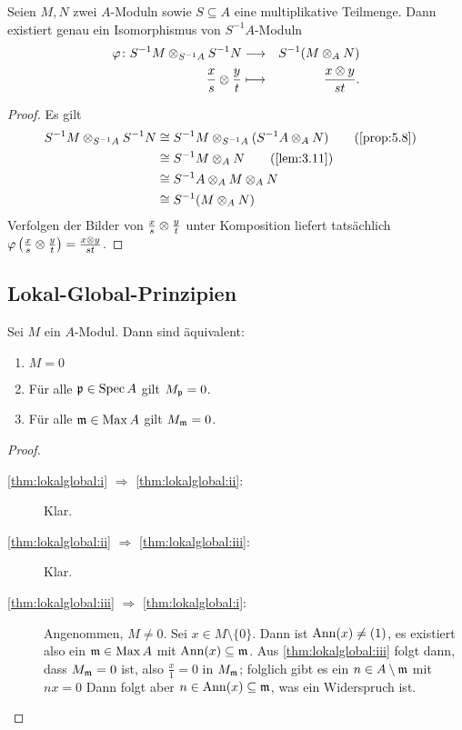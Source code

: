 \documentclass[12pt,a4paper]{scrartcl}
\theoremstyle{cplain}
\theoremstyle{cdef}
\begin{document}
\begin{satz}
	Seien $M,N$ zwei $A$-Moduln sowie $S\subseteq A$ eine multiplikative Teilmenge. Dann existiert genau ein Isomorphismus von $S^{-1}A$-Moduln
	\begin{eqnarray*}
		\varphi\colon S^{-1}M\otimes_{S^{-1}A}S^{-1}N &\longrightarrow& S^{-1}(M\otimes_AN) \\
		\frac xs\otimes \frac yt &\longmapsto& \frac{x\otimes y}{st}.
	\end{eqnarray*}
\end{satz}
\begin{proof}
	Es gilt
	\begin{align*}
		S^{-1}M\tp_{S^{-1}A}S^{-1}N &\cong S^{-1}M \tp_{S^{-1}A}(S^{-1}A\tp_AN) \tag{\cref{prop:5.8}} \\
		&\cong S^{-1}M\tp_A N \tag{\cref{lem:3.11}} \\
		&\cong S^{-1}A\tp_AM\tp_AN& \\ 
		&\cong S^{-1}(M\tp_AN)&
	\end{align*}
	Verfolgen der Bilder von $\frac xs\otimes \frac yt$ unter Komposition liefert tatsächlich $\varphi\left(\frac xs\otimes \frac yt\right) = \frac{x\otimes y}{st}$.
\end{proof}

\subsection{Lokal-Global-Prinzipien}
\begin{satz} \label{thm:lokalglobal}
	Sei $M$ ein $A$-Modul. Dann sind äquivalent:
	\begin{enumerate}
		\item $M = 0$ \label{thm:lokalglobal:i}
		\item Für alle $\mathfrak{p}\in \operatorname{Spec} A$ gilt $M_{\mathfrak{p}} = 0$. \label{thm:lokalglobal:ii}
		\item Für alle $\mathfrak{m}\in\operatorname{Max} A$ gilt $M_{\mathfrak{m}} = 0$. \label{thm:lokalglobal:iii}
	\end{enumerate}
\end{satz}
\begin{proof}
	\leavevmode
	\begin{description}
		\item[\ref{thm:lokalglobal:i} $\Rightarrow$ \ref{thm:lokalglobal:ii}:] Klar.
		\item[\ref{thm:lokalglobal:ii} $\Rightarrow$ \ref{thm:lokalglobal:iii}:] Klar.
		\item[\ref{thm:lokalglobal:iii} $\Rightarrow$ \ref{thm:lokalglobal:i}:] Angenommen, $M \neq 0$. Sei $x\in M\setminus \{0\}$. Dann ist $\operatorname{Ann}(x) \neq (1)$, es existiert also ein $\mathfrak{m}\in \operatorname{Max} A$ mit $\operatorname{Ann}(x)\subseteq \mathfrak{m}$. Aus \ref{thm:lokalglobal:iii} folgt dann, dass $M_{\mathfrak{m}} = 0$ ist, also $\frac x1 = 0$ in $M_{\mathfrak{m}}$; folglich gibt es ein $n\in A\setminus \mathfrak{m}$ mit $ nx = 0$ Dann folgt aber $n\in \operatorname{Ann}(x)\subseteq \mathfrak{m}$, was ein Widerspruch ist.
		\qedhere
	\end{description}
\end{proof}
\end{document}
